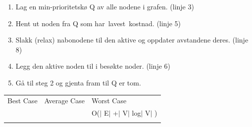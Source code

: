 \documentclass[12pt]{report}
\begin{document}

{\fontsize{10pt}{12.0pt}\selectfont \par}\par


\vspace{\baselineskip}

\vspace{\baselineskip}
\begin{enumerate}[label*=\arabic*.]
	\item Lag en min-prioritetskø Q av alle nodene i grafen. (linje 3)\par

	\item Hent ut noden fra Q som har lavest kostnad. (linje 5)\par

	\item Slakk (relax) nabonodene til den aktive og oppdater avstandene deres. (linje 8)\par

	\item Legg den aktive noden til i besøkte noder. (linje 6)\par

	\item Gå til steg 2 og gjenta fram til Q er tom.
\end{enumerate}\par


\vspace{\baselineskip}




\begin{table}[H]
 			\centering
\begin{tabular}{p{1.48in}p{2.06in}p{2.52in}}
\hline
\multicolumn{1}{p{1.48in}}{{\fontsize{13pt}{15.6pt}\selectfont Best Case}} & 
\multicolumn{1}{p{2.06in}}{{\fontsize{13pt}{15.6pt}\selectfont Average Case}} & 
\multicolumn{1}{p{2.52in}}{{\fontsize{13pt}{15.6pt}\selectfont Worst Case}} \\
\hhline{---}
\multicolumn{1}{p{1.48in}}{} & 
\multicolumn{1}{p{2.06in}}{} & 
\multicolumn{1}{p{2.52in}}{{\fontsize{14pt}{16.8pt}\selectfont O($ \vert $ E$ \vert $ +$ \vert $ V$ \vert $ log$ \vert $ V$ \vert $ )}} \\
\hhline{---}

\end{tabular}
 \end{table}
\end{document}
